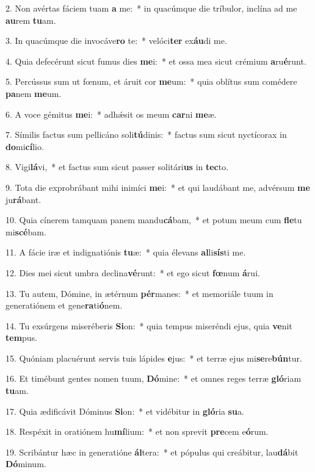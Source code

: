 2. Non avértas fáciem tuam \textbf{a} me:~*  in quacúmque die tríbulor, inclína ad me \textbf{au}rem \textbf{tu}am.\

3. In quacúmque die invocáve\textbf{ro} te:~*  velóci\textbf{ter} ex\textbf{áu}di me.\

4. Quia defecérunt sicut fumus dies \textbf{me}i:~*  et ossa mea sicut crémium \textbf{a}ru\textbf{é}runt.\

5. Percússus sum ut fœnum, et áruit cor \textbf{me}um:~*  quia oblítus sum comédere \textbf{pa}nem \textbf{me}um.\

6. A voce gémitus \textbf{me}i:~*  adhǽsit os meum \textbf{car}ni \textbf{me}æ.\

7. Símilis factus sum pellicáno soli\textbf{tú}dinis:~*  factus sum sicut nyctícorax in \textbf{do}mi\textbf{cí}lio.\

8. Vigi\textbf{lá}vi,~*  et factus sum sicut passer solitári\textbf{us} in \textbf{tec}to.\

9. Tota die exprobrábant mihi inimíci \textbf{me}i:~*  et qui laudábant me, advérsum \textbf{me} ju\textbf{rá}bant.\

10. Quia cínerem tamquam panem mandu\textbf{cá}bam,~*  et potum meum cum \textbf{fle}tu mi\textbf{scé}bam.\

11. A fácie iræ et indignatiónis \textbf{tu}æ:~*  quia élevans \textbf{al}li\textbf{sís}ti me.\

12. Dies mei sicut umbra declina\textbf{vé}runt:~*  et ego sicut \textbf{fœ}num \textbf{á}rui.\

13. Tu autem, Dómine, in ætérnum \textbf{pér}manes:~*  et memoriále tuum in generatiónem et gene\textbf{ra}ti\textbf{ó}nem.\

14. Tu exsúrgens miseréberis \textbf{Si}on:~*  quia tempus miseréndi ejus, quia \textbf{ve}nit \textbf{tem}pus.\

15. Quóniam placuérunt servis tuis lápides \textbf{e}jus:~*  et terræ ejus mi\textbf{se}re\textbf{bún}tur.\

16. Et timébunt gentes nomen tuum, \textbf{Dó}mine:~*  et omnes reges terræ \textbf{gló}riam \textbf{tu}am.\

17. Quia ædificávit Dóminus \textbf{Si}on:~*  et vidébitur in \textbf{gló}ria \textbf{su}a.\

18. Respéxit in oratiónem hu\textbf{mí}lium:~*  et non sprevit \textbf{pre}cem e\textbf{ó}rum.\

19. Scribántur hæc in generatióne \textbf{ál}tera:~*  et pópulus qui creábitur, lau\textbf{dá}bit \textbf{Dó}minum.\

